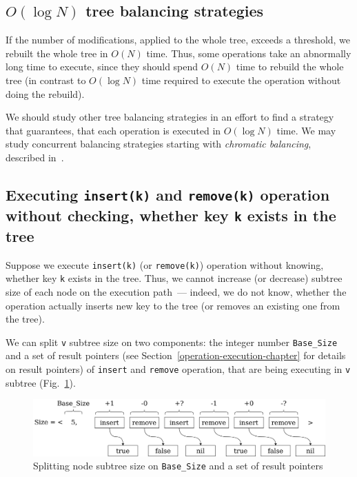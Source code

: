 \documentclass[times, dvipsnames,%
               languages={russian,english} %
              ]{itmo-student-thesis}
\begin{document}
\subsection{$O(\log N)$ tree balancing strategies}

If the number of modifications, applied to the whole tree, exceeds a threshold, we rebuilt the whole tree in $O(N)$ time. Thus, some operations take an abnormally long time to execute, since they should spend $O(N)$ time to rebuild the whole tree (in contrast to $O(\log N)$ time required to execute the operation without doing the rebuild). 

We should study other tree balancing strategies in an effort to find a strategy that guarantees, that each operation is executed in $O(\log N)$ time. We may study concurrent balancing strategies starting with \emph{chromatic balancing}, described in~\cite{nurmi1996chromatic}.

\subsection{Executing \texttt{insert(k)} and \texttt{remove(k)} operation without checking, whether  key \texttt{k} exists in the tree}

Suppose we execute \texttt{insert(k)} (or \texttt{remove(k)}) operation without knowing, whether key \texttt{k} exists in the tree. Thus, we cannot increase (or decrease) subtree size of each node on the execution path~--- indeed, we do not know, whether the operation actually inserts new key to the tree (or removes an existing one from the tree).

We can split \texttt{v} subtree size on two components: the integer number \texttt{Base\_Size} and a set of result pointers (see Section~\ref{operation-execution-chapter} for details on result pointers) of \texttt{insert} and \texttt{remove} operation, that are being executing in \texttt{v} subtree (Fig.~\ref{size-unfinished-operations-pic}). 

\begin{figure}[H]
  \centering
  \caption{Splitting node subtree size on \texttt{Base\_Size} and a set of result pointers}
  \label{size-unfinished-operations-pic}
  \includegraphics[width=\linewidth]{pics/size-unfinished-operations.png}
\end{figure}
\end{document}
